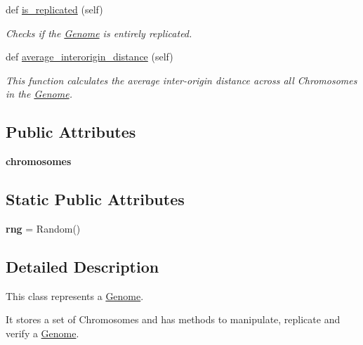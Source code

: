 \begin{DoxyCompactItemize}
def \mbox{\hyperlink{classReDyMo_1_1src_1_1genome_1_1Genome_a8351b706fc6f5c0f218c1dab6c04da46}{is\+\_\+replicated}} (self)
\begin{DoxyCompactList}\small\item\em Checks if the \mbox{\hyperlink{classReDyMo_1_1src_1_1genome_1_1Genome}{Genome}} is entirely replicated. \end{DoxyCompactList}\item 
def \mbox{\hyperlink{classReDyMo_1_1src_1_1genome_1_1Genome_a1c933cf2a91ad7dddeed4bc940c47ad2}{average\+\_\+interorigin\+\_\+distance}} (self)
\begin{DoxyCompactList}\small\item\em This function calculates the average inter-\/origin distance across all Chromosomes in the \mbox{\hyperlink{classReDyMo_1_1src_1_1genome_1_1Genome}{Genome}}. \end{DoxyCompactList}\end{DoxyCompactItemize}
\subsection*{Public Attributes}
\begin{DoxyCompactItemize}
\item 
\mbox{\label{classReDyMo_1_1src_1_1genome_1_1Genome_a90aa6bae9a3b2eeb3c9f63dd52e17ca6}} 
{\bfseries chromosomes}
\end{DoxyCompactItemize}
\subsection*{Static Public Attributes}
\begin{DoxyCompactItemize}
\item 
\mbox{\label{classReDyMo_1_1src_1_1genome_1_1Genome_a08e3ad3e0d245d003407891178177ad5}} 
{\bfseries rng} = Random()
\end{DoxyCompactItemize}


\subsection{Detailed Description}
This class represents a \mbox{\hyperlink{classReDyMo_1_1src_1_1genome_1_1Genome}{Genome}}. 

It stores a set of Chromosomes and has methods to manipulate, replicate and verify a \mbox{\hyperlink{classReDyMo_1_1src_1_1genome_1_1Genome}{Genome}}. 

